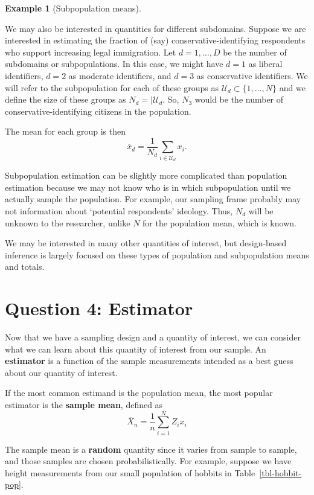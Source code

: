 \documentclass[
  13pt,
  letterpaper,
  DIV=11,
  numbers=noendperiod]{scrreprt}
\theoremstyle{plain}
\theoremstyle{definition}
\newtheorem{example}{Example}[chapter]
\theoremstyle{definition}
\theoremstyle{remark}
\begin{document}
\begin{example}[Subpopulation
means]\protect\hypertarget{exm-subpopulation}{}\label{exm-subpopulation}

We may also be interested in quantities for different subdomains.
Suppose we are interested in estimating the fraction of (say)
conservative-identifying respondents who support increasing legal
immigration. Let \(d= 1, \ldots, D\) be the number of subdomains or
subpopulations. In this case, we might have \(d = 1\) as liberal
identifiers, \(d = 2\) as moderate identifiers, and \(d = 3\) as
conservative identifiers. We will refer to the subpopulation for each of
these groups as \(\mathcal{U}_d \subset \{1,\ldots, N\}\) and we define
the size of these groups as \(N_d = |\mathcal{U}_d\). So, \(N_3\) would
be the number of conservative-identifying citizens in the population.

The mean for each group is then \[
\overline{x}_d = \frac{1}{N_d} \sum_{i \in \mathcal{U}_d} x_i.
\]

Subpopulation estimation can be slightly more complicated than
population estimation because we may not know who is in which
subpopulation until we actually sample the population. For example, our
sampling frame probably may not information about `potential
respondents' ideology. Thus, \(N_d\) will be unknown to the researcher,
unlike \(N\) for the population mean, which is known.

\end{example}

We may be interested in many other quantities of interest, but
design-based inference is largely focused on these types of population
and subpopulation means and totals.

\section{Question 4: Estimator}\label{question-4-estimator}

Now that we have a sampling design and a quantity of interest, we can
consider what we can learn about this quantity of interest from our
sample. An \textbf{estimator} is a function of the sample measurements
intended as a best guess about our quantity of interest.

If the most common estimand is the population mean, the most popular
estimator is the \textbf{sample mean}, defined as \[
\overline{X}_n = \frac{1}{n} \sum_{i=1}^{N}Z_ix_i
\]

The sample mean is a \textbf{random} quantity since it varies from
sample to sample, and those samples are chosen probabilistically. For
example, suppose we have height measurements from our small population
of hobbits in Table~\ref{tbl-hobbit-pop}.
\end{document}
